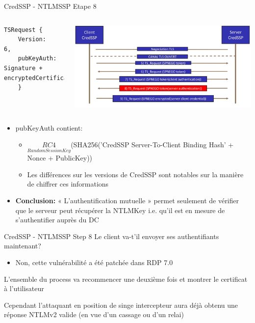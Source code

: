 \documentclass{beamer}
\begin{document}
\begin{frame}[fragile]{CredSSP - NTLMSSP Etape 8 }
	 \begin{columns}[T]
	 	 \begin{lstlisting}[frame=single,basicstyle=\tiny]
TSRequest {
	Version:     6,
	pubKeyAuth: Signature + encryptedCertificate,
	}
	\end{lstlisting}
	 \includegraphics[scale=0.055]{step8.jpg}
	 \end{columns}
	 	 	\begin{itemize}
	 	\item pubKeyAuth contient:
	 		\begin{itemize}
	 		\item $\underset{RandomSessionKey}{RC4}$(SHA256('CredSSP Server-To-Client Binding Hash' + Nonce + PublicKey))
	 		\item Les différences sur les versions de CredSSP sont notables sur la manière de chiffrer ces informations \newline
	 		
			\end{itemize}
			\item \textbf{Conclusion: } « L'authentification mutuelle » permet seulement de vérifier que le serveur peut récupérer la NTLMKey i.e. qu'il est en mesure de s'authentifier auprès du DC
	 	\end{itemize}
\end{frame}

\begin{frame}[fragile]{CredSSP - NTLMSSP Step 8 }
Le client va-t'il envoyer ses authentifiants maintenant? 
\begin{itemize}
\item Non, cette vulnérabilité a été patchée dans RDP 7.0\newline

\end{itemize}
L'ensemble du process va recommencer une deuxième fois et montrer le certificat à l'utilisateur\newline

Cependant l'attaquant en position de singe intercepteur aura déjà obtenu une réponse NTLMv2 valide (en vue d'un cassage ou d'un relai) 
\end{frame}
\end{document}
